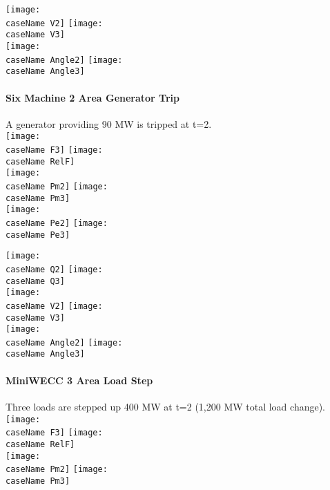 \documentclass[12pt]{article}
\newcommand{\caseName}{ }
\begin{document}
	\texttt{[image: \\caseName V2]} %
	\texttt{[image: \\caseName V3]} \\

	\texttt{[image: \\caseName Angle2]} %
	\texttt{[image: \\caseName Angle3]} 

\pagebreak
\renewcommand{\caseName}{SixMachineTrip0}
\paragraph{Six Machine 2 Area  Generator Trip} A generator providing 90 MW is tripped at t=2.\\

	\texttt{[image: \\caseName F3]} %
	\texttt{[image: \\caseName RelF]} \\

	\texttt{[image: \\caseName Pm2]} %
	\texttt{[image: \\caseName Pm3]} \\

	\texttt{[image: \\caseName Pe2]} %
	\texttt{[image: \\caseName Pe3]} 
	
\pagebreak

	\texttt{[image: \\caseName Q2]} %
	\texttt{[image: \\caseName Q3]} \\

	\texttt{[image: \\caseName V2]} %
	\texttt{[image: \\caseName V3]} \\

	\texttt{[image: \\caseName Angle2]} %
	\texttt{[image: \\caseName Angle3]} 

\pagebreak
\renewcommand{\caseName}{miniWECC3ALTDstep}
\paragraph{MiniWECC 3 Area Load Step} Three loads are stepped up 400 MW at t=2 (1,200 MW total load change).\\

	\texttt{[image: \\caseName F3]} %
	\texttt{[image: \\caseName RelF]} \\

	\texttt{[image: \\caseName Pm2]} %
	\texttt{[image: \\caseName Pm3]} \\
\end{document}
